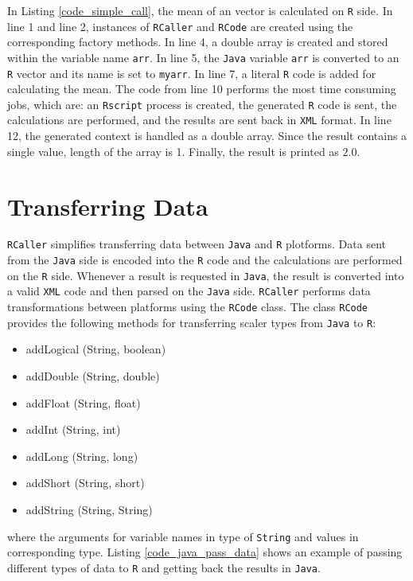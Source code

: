\documentclass[10pt,a4paper, final, oneside]{article}
\begin{document}
In Listing \ref{code_simple_call}, the mean of an vector is calculated on \texttt{R} side. In line 1 and line 2, instances of \texttt{RCaller} and \texttt{RCode} are created using the corresponding factory methods. In line 4, a double array is created and stored within the variable name \texttt{arr}. In line 5, the \texttt{Java} variable \texttt{arr} is converted to an \texttt{R} vector and its name is set to \texttt{myarr}. In line 7, a literal \texttt{R} code is added for calculating the mean. The code from line 10 performs the most time consuming jobs, which are: an \texttt{Rscript} process is created, the generated \texttt{R} code is sent, the calculations are performed, and the results are sent back in \texttt{XML} format. In line 12, the generated context is handled as a double array. Since the result contains a single value, length of the array is 1. Finally, the result is printed as $2.0$. 


\section{Transferring Data}
\label{sec:transferring_data}
\texttt{RCaller} simplifies transferring data between \texttt{Java} and \texttt{R} plotforms. Data sent from the \texttt{Java} side is encoded into the \texttt{R} code and the calculations are performed on the \texttt{R} side. Whenever a result is requested in \texttt{Java}, the result is converted into a valid \texttt{XML} code and then parsed on the \texttt{Java} side. \texttt{RCaller} performs data transformations between platforms using the \texttt{RCode} class. The class \texttt{RCode} provides the following methods for transferring scaler types from \texttt{Java} to \texttt{R}:

\begin{itemize}
\item addLogical (String, boolean)
\item addDouble (String, double)
\item addFloat (String, float)
\item addInt (String, int)
\item addLong (String, long)
\item addShort (String, short)
\item addString (String, String)
\end{itemize}

\noindent where the arguments for variable names in type of \texttt{String} and values in corresponding type. Listing \ref{code_java_pass_data} shows an example of passing different types of data to \texttt{R} and getting back the results in \texttt{Java}.
\end{document}

